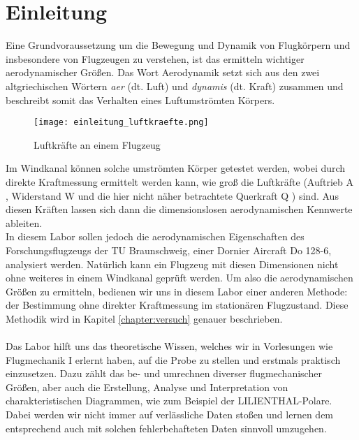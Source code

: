 \chapter{Einleitung}
\label{chapter:einleitung}

Eine Grundvoraussetzung um die Bewegung und Dynamik von Flugkörpern und insbesondere von Flugzeugen zu verstehen, ist das ermitteln wichtiger aerodynamischer Größen. Das Wort Aerodynamik setzt sich aus den zwei altgriechischen Wörtern \textit{aer} (dt. Luft) und \textit{dynamis} (dt. Kraft) zusammen und beschreibt somit das Verhalten eines Luftumströmten Körpers.

\begin{figure}[h] 
	\centering
	\texttt{[image: einleitung\_luftkraefte.png]}
	\caption{Luftkräfte an einem Flugzeug \cite{labor-skript}}
	\label{figure:luftkraefte}
\end{figure}

\noindent Im Windkanal können solche umströmten Körper getestet werden, wobei durch direkte Kraftmessung ermittelt werden kann, wie groß die Luftkräfte (Auftrieb A , Widerstand W  und die hier nicht näher betrachtete Querkraft Q ) sind. Aus diesen Kräften lassen sich dann die dimensionslosen aerodynamischen Kennwerte ableiten.\\
In diesem Labor sollen jedoch die aerodynamischen Eigenschaften des Forschungsflugzeugs der TU Braunschweig, einer Dornier Aircraft Do 128-6, analysiert werden. Natürlich kann ein Flugzeug mit diesen Dimensionen nicht ohne weiteres in einem Windkanal geprüft werden. Um also die aerodynamischen Größen zu ermitteln, bedienen wir uns in diesem Labor einer anderen Methode: der Bestimmung ohne direkter Kraftmessung im stationären Flugzustand. Diese Methodik wird in Kapitel \ref{chapter:versuch} genauer beschrieben.\\\\
Das Labor hilft uns das theoretische Wissen, welches wir in Vorlesungen wie Flugmechanik I erlernt haben, auf die Probe zu stellen und erstmals praktisch einzusetzen. Dazu zählt das be- und umrechnen diverser flugmechanischer Größen, aber auch die Erstellung, Analyse und Interpretation von charakteristischen Diagrammen, wie zum Beispiel der LILIENTHAL-Polare. Dabei werden wir nicht immer auf verlässliche Daten stoßen und lernen dem entsprechend auch mit solchen fehlerbehafteten Daten sinnvoll umzugehen.

